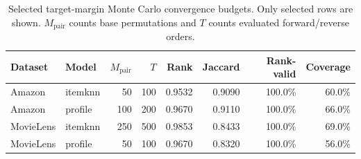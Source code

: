\begin{table}[t]\centering\small
\caption{Selected target-margin Monte Carlo convergence budgets. Only selected rows are shown. $M_{\mathrm{pair}}$ counts base permutations and $T$ counts evaluated forward/reverse orders.}
\label{tab:convergence}
\begin{tabular}{llrrrrrr}
\toprule
Dataset & Model & $M_{\mathrm{pair}}$ & $T$ & Rank & Jaccard & Rank-valid & Coverage \\
\midrule
Amazon & itemknn & 50 & 100 & 0.9532 & 0.9090 & 100.0\% & 60.0\% \\
Amazon & profile & 100 & 200 & 0.9670 & 0.9110 & 100.0\% & 66.0\% \\
MovieLens & itemknn & 250 & 500 & 0.9853 & 0.8433 & 100.0\% & 69.0\% \\
MovieLens & profile & 50 & 100 & 0.9670 & 0.8320 & 100.0\% & 56.0\% \\
\bottomrule
\end{tabular}
\end{table}
